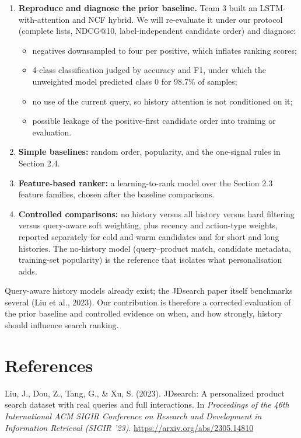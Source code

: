\documentclass[11pt,a4paper]{article}
\newenvironment{hangparagraph}{\par\setlength{\leftskip}{1.2cm}\setlength{\parindent}{-1.2cm}}{\par}
\begin{document}
\begin{enumerate}
\item \textbf{Reproduce and diagnose the prior baseline.} Team 3 built an LSTM-with-attention and NCF hybrid. We will re-evaluate it under our protocol (complete lists, NDCG@10, label-independent candidate order) and diagnose:
  \begin{itemize}
  \item negatives downsampled to four per positive, which inflates ranking scores;
  \item 4-class classification judged by accuracy and F1, under which the unweighted model predicted class 0 for 98.7\% of samples;
  \item no use of the current query, so history attention is not conditioned on it;
  \item possible leakage of the positive-first candidate order into training or evaluation.
  \end{itemize}
\item \textbf{Simple baselines:} random order, popularity, and the one-signal rules in Section 2.4.
\item \textbf{Feature-based ranker:} a learning-to-rank model over the Section 2.3 feature families, chosen after the baseline comparisons.
\item \textbf{Controlled comparisons:} no history versus all history versus hard filtering versus query-aware soft weighting, plus recency and action-type weights, reported separately for cold and warm candidates and for short and long histories. The no-history model (query--product match, candidate metadata, training-set popularity) is the reference that isolates what personalisation adds.
\end{enumerate}

Query-aware history models already exist; the JDsearch paper itself benchmarks several (Liu et al., 2023). Our contribution is therefore a corrected evaluation of the prior baseline and controlled evidence on when, and how strongly, history should influence search ranking.

\section*{References}

\begin{hangparagraph}
Liu, J., Dou, Z., Tang, G., \& Xu, S. (2023). JDsearch: A personalized product search dataset with real queries and full interactions. In \textit{Proceedings of the 46th International ACM SIGIR Conference on Research and Development in Information Retrieval (SIGIR '23)}. \url{https://arxiv.org/abs/2305.14810}
\end{hangparagraph}
\end{document}
